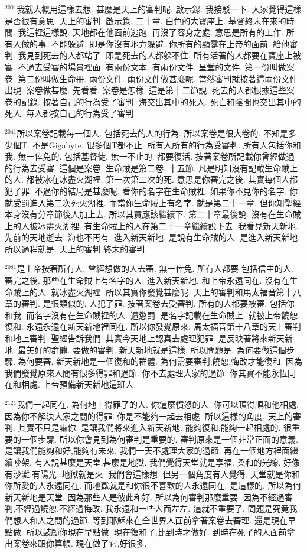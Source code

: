 \documentclass{book}
\begin{document}
$^{2001}$我就大概用這樣去想.
甚麼是天上的審判呢.
啟示錄.
我接駁一下.
大家覺得這樣是否很有意思.
天上的審判.
啟示錄.
二十章.
白色的大寶座上.
基督終末在來的時間.
我這裡這樣說.
天地都在他面前逃跑.
再沒了容身之處.
意思是所有的工作.
所有人做的事.
不能躲避.
即是你沒有地方躲避.
你所有的顯露在上帝的面前.
給他審判.
我見到死去的人都站了.
即是死去的人都躲不住.
所有活著的人都要在寶座上被審.
不過去受審的場景裡面.
有兩份文本.
有兩份文件.
呈堂的文件.
第一份叫做案卷.
第二份叫做生命冊.
兩份文件.
兩份文件做甚麼呢.
當然審判就按著這兩份文件出現.
案卷做甚麼.
先看看.
案卷是怎樣.
這是第十二節說.
死去的人都根據這些案卷的記錄.
按著自己的行為受了審判.
海交出其中的死人.
死亡和陰間也交出其中的死人.
每人都按自己的行為受了審判.

$^{2041}$所以案卷記載每一個人.
包括死去的人的行為.
所以案卷是很大卷的.
不知是多少個T.
不是Gigabyte.
很多個T都不止.
所有人所有的行為受審判.
所有人包括你和我.
無一倖免的.
包括基督徒.
無一不止的.
都要復活.
按著案卷所記載你曾經做過的行為去受審.
這個是案卷.
生命賊是第二卷.
十五節.
凡是明知沒有記載生命賊上的人.
都被冰在冰盡火湖裡.
第一次第二次的死.
意思是你審完之後.
其實每個人都犯了罪.
不過你的結局是甚麼呢.
看你的名字在生命賊裡.
如果你不見你的名字.
你就受罰進入第二次死火湖裡.
而當你生命賊上有名字.
就是第二十一章.
但你知聖經本身沒有分章節後人加上去.
所以其實應該繼續下.
第二十章最後說.
沒有在生命賊上的人被冰盡火湖裡.
有生命賊上的人在第二十一章繼續說下去.
我看見新天新地.
先前的天地逝去.
海也不再有.
進入新天新地.
是說有生命賊的人.
是進入新天新地.
所以過程就是.
天上的審判 終末的審判.

$^{2081}$是上帝按著所有人.
曾經想做的人去審.
無一倖免.
所有人都要 包括信主的人.
審完之後.
那些在生命賊上有名字的人.
進入新天新地.
和上帝永遠同在.
沒有在生命賊上的人.
就冰盡火湖裡.
所以其實你發覺甚麼呢.
天上的審判和馬太福音第十八章的審判.
是很類似的.
人犯了罪.
按著案卷去受審判.
所有的人都要被審.
包括你和我.
而名字沒有在生命賊裡的人.
遭懲罰.
是名字記載在生命賊上.
就被上帝饒恕.
復和.
永遠永遠在新天新地裡同在.
所以你發覺原來.
馬太福音第十八章的天上審判和地上審判.
聖經告訴我們.
其實今天地上認真去處理犯罪.
是反映著將來新天新地.
最美好的群體.
要做的審判.
新天新地就是這樣.
所以問題是.
為何要做這個步驟.
為何要審.
新天新地是一個復和的群體.
為何需要審判,饒恕,悔改才能復和.
因為我們發覺原來人間有很多得罪和過節.
你不去處理大家的過節.
你其實不能永恆同在和相處.
上帝預備新天新地這班人.

$^{2121}$我們一起同在.
為何地上得罪了的人.
你這麼憤怒的人.
你可以頂得順和他相處.
因為你不解決大家之間的得罪.
你是不能夠一起去相處.
所以這樣的角度.
天上的審判.
其實不只是嚇你.
是讓我們將來進入新天新地.
能夠復和,能夠一起相處的.
很重要的一個步驟.
所以你會見到為何審判是重要的.
審判原來是一個非常正面的意義.
是讓我們能夠和好,能夠有未來.
我們一天不處理大家的過節.
再在一個地方裡面繼續吵架.
有人說甚麼是天堂,甚麼是地獄.
我們覺得天堂就是享福.
柔和的光線.
好像有沙灘,有陽光.
地獄就是火.
我們會這樣想.
但另一個角度有人覺得.
天堂就是你和你所愛的人永遠同在.
而地獄就是和你很不喜歡的人永遠同在.
是這樣的.
所以為何新天新地是天堂.
因為那些人是彼此和好.
所以為何審判那麼重要.
因為不經過審判,不經過饒恕,不經過悔改.
我永遠和一些人面左左.
這就不重要了.
問題是究竟我們想人和人之間的過節.
等到耶穌來在全世界人面前拿著案卷去審理.
還是現在早點做.
所以鼓勵你現在早點做.
現在復和了,比到時才做好.
到時在死了的人面前拿出案卷來跟你算帳.
現在做了它,好很多.
\end{document}
